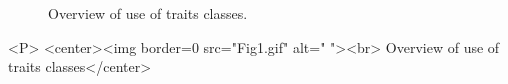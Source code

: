 \begin{ccTexOnly}

\begin{figure} [t]
  \begin{center}
  \leavevmode
  \vspace*{6cm}
  \hspace*{-2cm}
  \end{center}
  \vspace*{-8cm}
  \caption{Overview of use of traits classes.}
  \label{ASPAS:Fig1}
\end{figure}

\end{ccTexOnly}

\lcHtml{\label{ASPAS:Fig1}}
\begin{ccHtmlOnly}
<P>
<center><img border=0 src="Fig1.gif" alt=" "><br>
Overview of use of traits classes</center>
\end{ccHtmlOnly}










